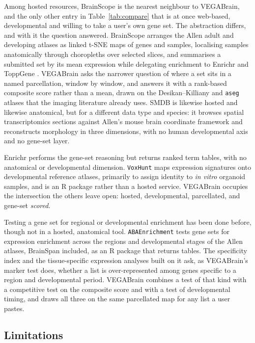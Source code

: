 \documentclass[pdflatex,sn-basic]{sn-jnl}
\begin{document}
Among hosted resources, BrainScope \citep{Huisman2017} is the nearest neighbour
to VEGABrain, and the only other entry in Table~\ref{tab:compare} that is at
once web-based, developmental and willing to take a user's own gene set. The
abstraction differs, and with it the question answered. BrainScope arranges the
Allen adult and developing atlases as linked t-SNE maps of genes and samples,
localising samples anatomically through choropleths over selected slices, and
summarises a submitted set by its mean expression while delegating enrichment to
Enrichr \citep{Chen2013} and ToppGene \citep{Chen2009}. VEGABrain asks the narrower question of where a set sits
in a named parcellation, window by window, and answers it with a rank-based
composite score rather than a mean, drawn on the Desikan--Killiany and
\texttt{aseg} atlases that the imaging literature already uses. SMDB
\citep{Cao2023} is likewise hosted and likewise anatomical, but for a different
data type and species: it browses spatial transcriptomics sections against
Allen's mouse brain coordinate framework and reconstructs morphology in three
dimensions, with no human developmental axis and no gene-set layer.

Enrichr \citep{Chen2013,Kuleshov2016} performs the gene-set reasoning but
returns ranked term tables, with no anatomical or developmental dimension.
\texttt{VoxHunt} \citep{Fleck2021} maps expression signatures onto developmental
reference atlases, primarily to assign identity to \emph{in vitro} organoid
samples, and is an R package rather than a hosted service. VEGABrain occupies the
intersection the others leave open: hosted, developmental, parcellated, and
gene-set \emph{scored}.

Testing a gene set for regional or developmental enrichment has been done
before, though not in a hosted, anatomical tool. \texttt{ABAEnrichment}
\citep{Grote2016} tests gene sets for expression enrichment across the regions
and developmental stages of the Allen atlases, BrainSpan included, as an R
package that returns tables. The specificity index and the tissue-specific
expression analyses built on it \citep{Dougherty2010,Xu2014} ask, as VEGABrain's
marker test does, whether a list is over-represented among genes specific to a
region and developmental period. VEGABrain combines a test of that kind with a
competitive test on the composite score and with a test of developmental
timing, and draws all three on the same parcellated map for any list a user
pastes.

\subsection{Limitations}\label{sec:limitations}
\end{document}
